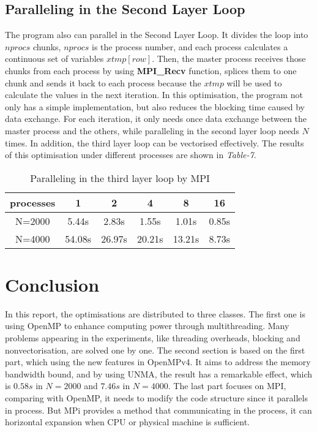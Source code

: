 \documentclass[10pt, a4paper]{article}
\begin{document}
    
    \subsection{Paralleling in the Second Layer Loop}
	
    The program also can parallel in the Second Layer Loop. It divides the loop into $nprocs$ chunks, $nprocs$ is the process number, and each process calculates a continuous set of variables $xtmp[row]$. Then, the master process receives those chunks from each process by using \textbf{MPI\_Recv} function, splices them to one chunk and sends it back to each process because the $xtmp$ will be used to calculate the values in the next iteration. In this optimisation, the program not only has a simple implementation, but also reduces the blocking time caused by data exchange. For each iteration, it only needs once data exchange between the master process and the others, while paralleling in the second layer loop needs $N$ times. In addition, the third layer loop can be vectorised effectively. The results of this optimisation under different processes are shown in \textit{Table-7}.
	
	\begin{table}[h!]
    \centering
    \begin{tabular}{ |c|c|c|c|c|c| } 
     \hline
     processes  & 1 & 2 & 4 & 8 & 16 \\ \hline
     N=2000  & 5.44s & 2.83s & 1.55s & 1.01s & 0.85s \\ \hline
     N=4000  & 54.08s & 26.97s & 20.21s & 13.21s & 8.73s \\ \hline
    \end{tabular}
    \caption{Paralleling in the third layer loop by MPI }
    \end{table}

	
	
	\section{Conclusion}
	
    In this report, the optimisations are distributed to three classes. The first one is using OpenMP to enhance computing power through multithreading. Many problems appearing in the experiments, like threading overheads, blocking and nonvectorisation, are solved one by one. The second section is based on the first part, which using the new features in OpenMPv4. It aims to address the memory bandwidth bound, and by using UNMA, the result has a remarkable effect, which is $0.58s$ in $N=2000$ and $7.46s$ in $N=4000$. The last part focuses on MPI, comparing with OpenMP, it needs to modify the code structure since it parallels in process. But MPi provides a method that communicating in the process, it can horizontal expansion when CPU or physical machine is sufficient. 
	
%
%
		
\end{document}
